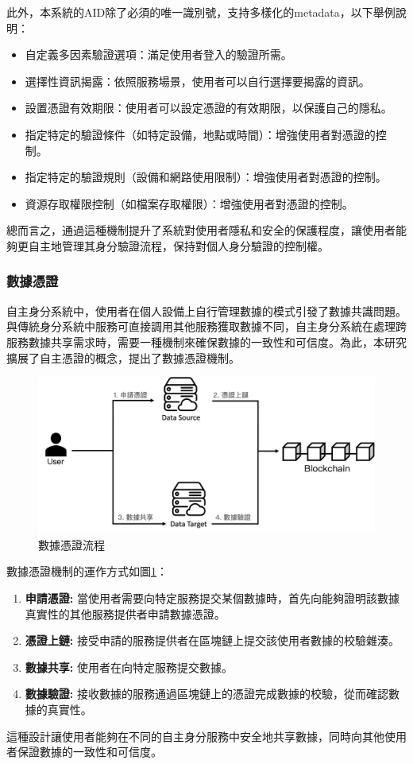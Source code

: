 此外，本系統的AID除了必須的唯一識別號，支持多樣化的metadata，以下舉例說明：
\begin{itemize}
  \item 自定義多因素驗證選項：滿足使用者登入的驗證所需。
  \item 選擇性資訊揭露：依照服務場景，使用者可以自行選擇要揭露的資訊。
  \item 設置憑證有效期限：使用者可以設定憑證的有效期限，以保護自己的隱私。
  \item 指定特定的驗證條件（如特定設備，地點或時間）：增強使用者對憑證的控制。
  \item 指定特定的驗證規則（設備和網路使用限制）：增強使用者對憑證的控制。
  \item 資源存取權限控制（如檔案存取權限）：增強使用者對憑證的控制。
\end{itemize}

總而言之，通過這種機制提升了系統對使用者隱私和安全的保護程度，讓使用者能夠更自主地管理其身分驗證流程，保持對個人身分驗證的控制權。
\subsubsection{數據憑證}
自主身分系統中，使用者在個人設備上自行管理數據的模式引發了數據共識問題。與傳統身分系統中服務可直接調用其他服務獲取數據不同，自主身分系統在處理跨服務數據共享需求時，需要一種機制來確保數據的一致性和可信度。為此，本研究擴展了自主憑證的概念，提出了數據憑證機制。
\begin{figure}
  \centering
  \includegraphics[width=\linewidth,keepaspectratio]{figures/flow-dc.png}
  \caption{數據憑證流程}
  \label{fig:flow-dc}
\end{figure}
數據憑證機制的運作方式如圖\ref{fig:flow-dc}：
\begin{enumerate}
  \item \textbf{申請憑證:} 當使用者需要向特定服務提交某個數據時，首先向能夠證明該數據真實性的其他服務提供者申請數據憑證。
  \item \textbf{憑證上鏈:} 接受申請的服務提供者在區塊鏈上提交該使用者數據的校驗雜湊。
  \item \textbf{數據共享:} 使用者在向特定服務提交數據。
  \item \textbf{數據驗證:} 接收數據的服務通過區塊鏈上的憑證完成數據的校驗，從而確認數據的真實性。
\end{enumerate}
這種設計讓使用者能夠在不同的自主身分服務中安全地共享數據，同時向其他使用者保證數據的一致性和可信度。

